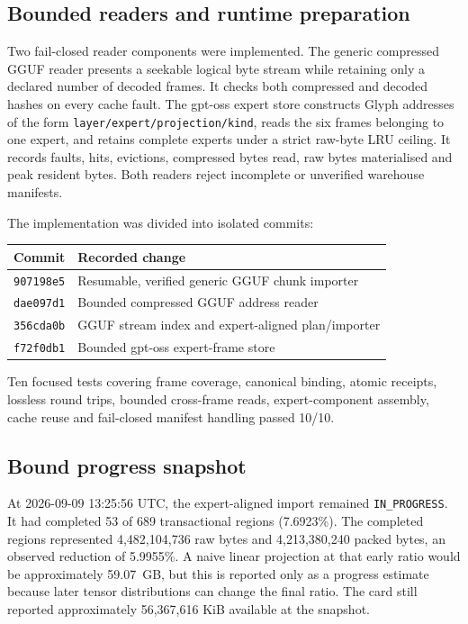 \subsection{Bounded readers and runtime preparation}

Two fail-closed reader components were implemented.  The generic compressed
GGUF reader presents a seekable logical byte stream while retaining only a
declared number of decoded frames.  It checks both compressed and decoded
hashes on every cache fault.  The gpt-oss expert store constructs Glyph
addresses of the form
\texttt{layer/expert/projection/kind}, reads the six frames belonging to one
expert, and retains complete experts under a strict raw-byte LRU ceiling.
It records faults, hits, evictions, compressed bytes read, raw bytes
materialised and peak resident bytes.  Both readers reject incomplete or
unverified warehouse manifests.

The implementation was divided into isolated commits:
\begin{center}
\begin{tabular}{ll}
\toprule
Commit & Recorded change \\
\midrule
\texttt{907198e5} & Resumable, verified generic GGUF chunk importer \\
\texttt{dae097d1} & Bounded compressed GGUF address reader \\
\texttt{356cda0b} & GGUF stream index and expert-aligned plan/importer \\
\texttt{f72f0db1} & Bounded gpt-oss expert-frame store \\
\bottomrule
\end{tabular}
\end{center}
Ten focused tests covering frame coverage, canonical binding, atomic receipts,
lossless round trips, bounded cross-frame reads, expert-component assembly,
cache reuse and fail-closed manifest handling passed 10/10.

\subsection{Bound progress snapshot}

At 2026-09-09 13:25:56 UTC, the expert-aligned import remained
\texttt{IN\_PROGRESS}.  It had completed 53 of 689 transactional regions
(7.6923\%).  The completed regions represented 4,482,104,736 raw bytes and
4,213,380,240 packed bytes, an observed reduction of 5.9955\%.  A naive linear
projection at that early ratio would be approximately 59.07~GB, but this is
reported only as a progress estimate because later tensor distributions can
change the final ratio.  The card still reported approximately 56,367,616
KiB available at the snapshot.

